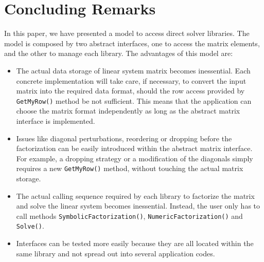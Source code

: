 \documentclass[acmtocl]{acmtrans2m}
\begin{document}
\section{Concluding Remarks}
\label{sec:conclusions}

In this paper, we have presented a model to access direct
solver libraries. The model is composed by two abstract interfaces, one to
access the matrix elements, and the other to manage each library.
The advantages of this model are:
\begin{itemize}

\item The actual data storage of linear system matrix becomes inessential.
Each concrete implementation will take care, if necessary, to convert the
input matrix into the required data format, should the row access provided by
\verb!GetMyRow()! method be not sufficient. This means that the
application can choose the matrix format independently as long as the abstract
matrix interface is implemented.

\item Issues like diagonal perturbations, reordering or dropping before the
factorization can be easily introduced within the abstract matrix interface.
For example, a dropping strategy or a modification of the diagonals simply
requires a new \verb!GetMyRow()! method, without touching the actual matrix
storage.

\item The actual calling sequence required by each library to factorize the
matrix and solve the linear system becomes inessential. Instead, the user only
has to call methods \verb!SymbolicFactorization()!, \verb!NumericFactorization()! and
\verb!Solve()!.

\item Interfaces can be tested more easily because they are all located within
the same library and not spread out into several application codes.
\end{itemize}
\end{document}

